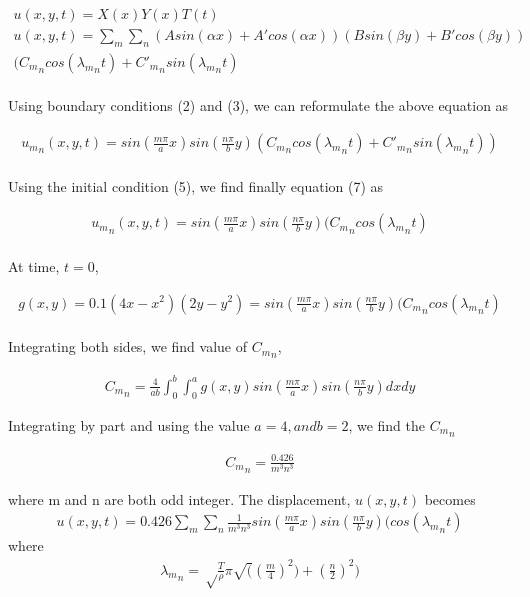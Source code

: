 \documentclass[12pt]{article}
\begin{document}
\begin{enumerate}[{\bf I.}]
\begin{enumerate}
\begin{align}
\nonumber
u(x,y,t) = X(x)Y(x)T(t)\\
\nonumber
 u(x,y,t) = \sum_m \sum_n (Asin(\alpha x) + A'cos(\alpha x))(Bsin(\beta y) + B'cos(\beta y)) \\ 
\nonumber
({C_m}_ncos({\lambda_m}_nt) + {C'_m}_nsin({\lambda_m}_nt)
\nonumber
 \end{align}
\\
Using boundary conditions (2) and (3), we can reformulate the above equation as

\begin{align}
 {u_m}_n(x,y,t) = sin(\frac{m\pi}{a}x) sin(\frac{n\pi}{b}y)({C_m}_ncos({\lambda_m}_nt) + {C'_m}_n sin({\lambda_m}_nt))
\end{align} 
 \\
 Using the initial condition (5), we find finally equation (7) as
 
 \begin{align}
  {u_m}_n(x,y,t) = sin(\frac{m\pi}{a}x) sin(\frac{n\pi}{b}y)({C_m}_ncos({\lambda_m}_nt)
 \end{align}
 \\
 At time, $ t=0 $,
 
 \begin{align}
 g(x,y) = 0.1(4x - x^2)(2y - y^2)  = sin(\frac{m\pi}{a}x) sin(\frac{n\pi}{b}y)({C_m}_ncos({\lambda_m}_nt)
 \end{align}
 \\
 
 Integrating both sides, we find value of ${C_m}_n$,
 
 \begin{align}
 {C_m}_n = \frac{4}{ab} \int_{0}^{b} \int_{0}^{a} g(x,y) sin(\frac{m\pi}{a}x) sin(\frac{n\pi}{b}y)dxdy 
 \end{align}
 
  Integrating by part and using the value $a=4, and b =2 $, we find the ${C_m}_n$
  
  \begin{align}
  {C_m}_n = \frac{0.426}{m^3n^3}
  \end{align}
 
 where m and n are both odd integer. The displacement, $u(x,y,t)$ becomes
\begin{align}
 u(x,y,t) = 0.426 \sum_m \sum_n \frac{1}{m^3n^3}sin(\frac{m\pi}{a}x) sin(\frac{n\pi}{b}y)(cos({\lambda_m}_nt)
\end{align} 
 where 
 \begin{align}
 {\lambda_m}_n = \sqrt\frac{T}{\rho}\pi\sqrt((\frac{m}{4})^2) +(\frac{n}{2})^2) 
 \end{align}
 

\end{enumerate}
\end{enumerate}
\end{document}
